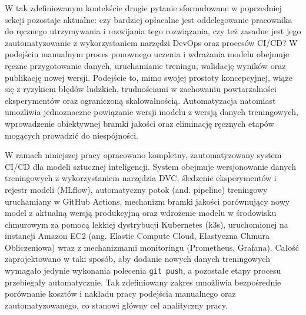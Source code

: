 W tak zdefiniowanym kontekście drugie pytanie sformułowane w poprzedniej sekcji pozostaje aktualne: czy bardziej opłacalne jest oddelegowanie pracownika do ręcznego utrzymywania i rozwijania tego rozwiązania, czy też zasadne jest jego zautomatyzowanie z wykorzystaniem narzędzi DevOps oraz procesów CI/CD? W podejściu manualnym proces ponownego uczenia i wdrażania modelu obejmuje ręczne przygotowanie danych, uruchamianie treningu, walidację wyników oraz publikację nowej wersji. Podejście to, mimo swojej prostoty koncepcyjnej, wiąże się z ryzykiem błędów ludzkich, trudnościami w zachowaniu powtarzalności eksperymentów oraz ograniczoną skalowalnością. Automatyzacja natomiast umożliwia jednoznaczne powiązanie wersji modelu z wersją danych treningowych, wprowadzenie obiektywnej bramki jakości oraz eliminację ręcznych etapów mogących prowadzić do niespójności.

W ramach niniejszej pracy opracowano kompletny, zautomatyzowany system CI/CD dla modeli sztucznej inteligencji. System obejmuje wersjonowanie danych treningowych z wykorzystaniem narzędzia DVC, śledzenie eksperymentów i rejestr modeli (MLflow), automatyczny potok (and. pipeline) treningowy uruchamiany w GitHub Actions, mechanizm bramki jakości porównujący nowy model z aktualną wersją produkcyjną oraz wdrożenie modelu w środowisku chmurowym za pomocą lekkiej dystrybucji Kubernetes (k3s), uruchomionej na instancji Amazon EC2  (ang. Elastic Compute Cloud, Elastyczna Chmura Obliczeniowa) wraz z mechanizmami monitoringu (Prometheus, Grafana). Całość zaprojektowano w taki sposób, aby dodanie nowych danych treningowych wymagało jedynie wykonania polecenia \texttt{git push}, a pozostałe etapy procesu przebiegały automatycznie. Tak zdefiniowany zakres umożliwia bezpośrednie porównanie kosztów i nakładu pracy podejścia manualnego oraz zautomatyzowanego, co stanowi główny cel analityczny pracy.

